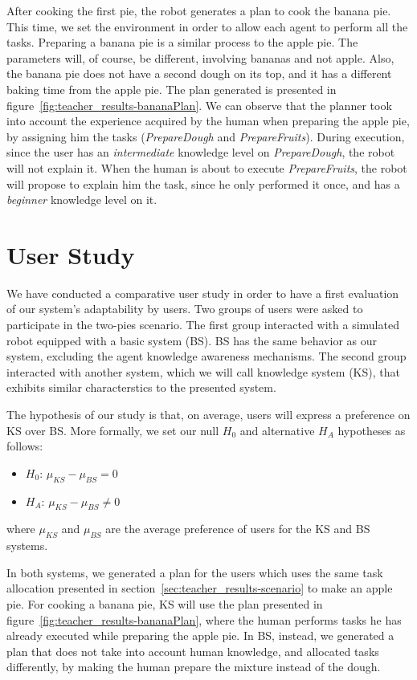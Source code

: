 After cooking the first pie, the robot generates a plan to cook the banana pie. This time, we set the environment in order to allow  each agent to perform all the tasks. Preparing a banana pie is a similar process to the apple pie. The parameters will, of course, be different, involving bananas and not apple. Also, the banana pie does not have a second dough on its top, and it has a different baking time from the apple pie. The plan generated is presented in figure~\ref{fig:teacher_results-bananaPlan}. We can observe that the planner took into account the experience acquired by the human when preparing the apple pie, by assigning him the tasks (\textit{PrepareDough} and \textit{PrepareFruits}). During execution, since the user has an \textit{intermediate} knowledge level on \textit{PrepareDough}, the robot will not explain it. When the human is about to execute \textit{PrepareFruits}, the robot will propose to explain him the task, since he only performed it once, and has a \textit{beginner} knowledge level on it.


\section{User Study}
\label{sec:teacher_results-user_study}
We have conducted a comparative user study in order to have a first evaluation of our system's adaptability by users. Two groups of users were asked to participate in the two-pies scenario. The first group interacted with a simulated robot equipped with a basic system (BS). BS has the same behavior as our system, excluding the agent knowledge awareness mechanisms. The second group interacted with another system, which we will call knowledge system (KS), that exhibits similar characterstics to the presented system.

The hypothesis of our study is that, on average, users will express a preference on KS over BS. More formally, we set our null $H_0$ and alternative $H_A$ hypotheses as follows:
\begin{itemize}
\item $H_0$: $\mu_{KS}-\mu_{BS}=0$ 
\item $H_A$: $\mu_{KS}-\mu_{BS} \neq 0$  
\end{itemize}
where $\mu_{KS}$ and $\mu_{BS}$ are the average preference of users for the KS and BS systems.

In both systems, we generated a plan for the users which uses the same task  allocation presented in section~\ref{sec:teacher_results-scenario} to make an apple pie. For cooking a banana pie, KS will use the plan presented in figure~\ref{fig:teacher_results-bananaPlan}, where the human performs tasks he has already executed while preparing the apple pie. In BS, instead, we generated a plan that does not take into account human knowledge, and allocated tasks differently, by making the human prepare the mixture instead of the dough.

